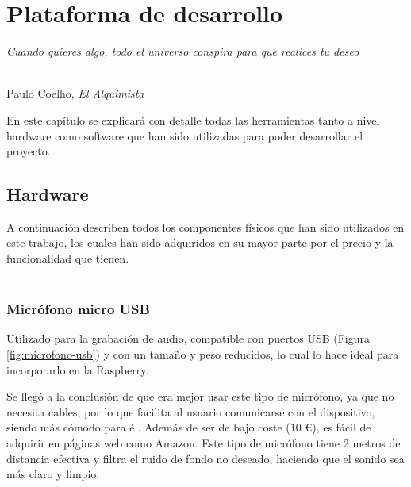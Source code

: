 \chapter{Plataforma de desarrollo}
\label{cap:capitulo4}


\begin{flushright}
\begin{minipage}[]{10cm}
\emph{Cuando quieres algo, todo el universo conspira para que realices tu deseo}\\
\end{minipage}\\

Paulo Coelho, \textit{El Alquimista}\\
\end{flushright}

\vspace{1cm}

En este capítulo se explicará con detalle todas las herramientas tanto a nivel hardware como software que han sido utilizadas para poder desarrollar el proyecto.


\section{Hardware}
\label{sec:hardware}

A continuación describen todos los componentes físicos que han sido utilizados en este trabajo, los cuales han sido adquiridos en su mayor parte por el precio y la funcionalidad que tienen.\\ \\


\subsection{Micrófono micro USB}
\label{subsec:micro}

Utilizado para la grabación de audio, compatible con puertos USB (Figura \ref{fig:microfono-usb}) y con un tamaño y peso reducidos, lo cual lo hace ideal para incorporarlo en la Raspberry. 


Se llegó a la conclusión de que era mejor usar este tipo de micrófono, ya que no necesita cables, por lo que facilita al usuario comunicarse con el dispositivo, siendo más cómodo para él. Además de ser de bajo coste (10 \euro), es fácil de adquirir en páginas web como Amazon. Este tipo de micrófono tiene 2 metros de distancia efectiva y filtra el ruido de fondo no deseado, haciendo que el sonido sea más claro y limpio.



